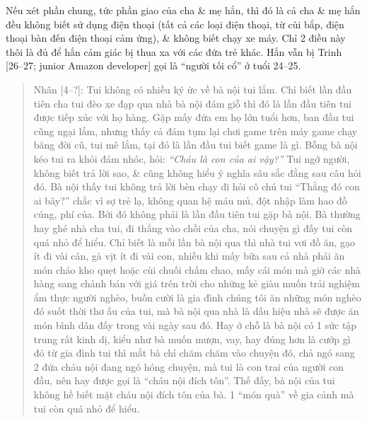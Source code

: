 \documentclass[12pt,twoside]{book}
\begin{document}
Nếu xét phần chung, tức phần giao của cha \& mẹ hắn, thì đó là cả cha \& mẹ hắn đều không biết sử dụng điện thoại (tất cả các loại điện thoại, từ cùi bắp, điện thoại bàn đến điện thoại cảm ứng), \& không biết chạy xe máy. Chỉ 2 điều này thôi là đủ để hắn cảm giác bị thua xa với các đứa trẻ khác. Hắn vẫn bị {\sf Trinh [26--27; junior Amazon developer]} gọi là ``người tối cổ'' ở tuổi 24--25.
\begin{quote}
	{\sf Nhân [4--?]}: Tui không có nhiều ký ức về bà nội tui lắm. Chỉ biết lần đầu tiên cha tui đèo xe đạp qua nhà bà nội đám giỗ thì đó là lần đầu tiên tui được tiếp xúc với họ hàng. Gặp mấy đứa em họ lớn tuổi hơn, ban đầu tui cũng ngại lắm, nhưng thấy cả đám tụm lại chơi game trên máy game chạy băng đời cũ, tui mê lắm, tại đó là lần đầu tui biết game là gì. Bỗng bà nội kéo tui ra khỏi đám nhóc, hỏi: {\it``Cháu là con của ai vậy?''} Tui ngớ người, không biết trả lời sao, \& cũng không hiểu ý nghĩa sâu sắc đằng sau câu hỏi đó. Bà nội thấy tui không trả lời bèn chạy đi hỏi cô chú tui ``Thằng đó con ai bây?'' chắc vì sợ trẻ lạ, không quan hệ máu mủ, đột nhập làm hao đồ cúng, phí của. Bởi đó không phải là lần đầu tiên tui gặp bà nội. Bà thường hay ghé nhà cha tui, đi thẳng vào chồi của cha, nói chuyện gì đấy tui còn quá nhỏ để hiểu. Chỉ biết là mỗi lần bà nội qua thì nhà tui vơi đồ ăn, gạo ít đi vài cân, gà vịt ít đi vài con, nhiều khi mấy bữa sau cả nhà phải ăn món cháo kho quẹt hoặc cùi chuối chấm chao, mấy cái món mà giờ các nhà hàng sang chảnh bán với giá trên trời cho những kẻ giàu muốn trải nghiệm ẩm thực người nghèo, buồn cười là gia đình chúng tôi ăn những món nghèo đó suốt thời thơ ấu của tui, mà bà nội qua nhà là dấu hiệu nhà sẽ được ăn món bình dân đấy trong vài ngày sau đó. Hay ở chỗ là bà nội có 1 sức tập trung rất kinh dị, kiểu như bà muốn mượn, vay, hay đúng hơn là cướp gì đó từ gia đình tui thì mắt bà chỉ chăm chăm vào chuyện đó, chả ngó sang 2 đứa cháu nội đang ngó hóng chuyện, mà tui là con trai của người con đầu, nên hay được gọi là ``cháu nội đích tôn''. Thế đấy, bà nội của tui không hề biết mặt cháu nội đích tôn của bà. 1 ``món quà'' về gia cảnh mà tui còn quá nhỏ để hiểu.
	

\end{quote}
\end{document}

